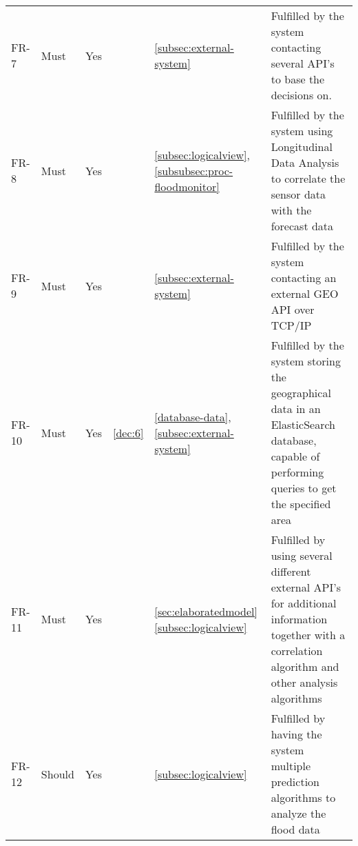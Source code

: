 \begin{table}[H]
\begin{tabular}{lllllL{0.5\textwidth}}
		FR-7  & Must     & Yes        & &\ref{subsec:external-system}         & Fulfilled by the system contacting several API's to base the decisions on. \\ 
		
		FR-8  & Must     & Yes        & &\ref{subsec:logicalview}, \ref{subsubsec:proc-floodmonitor} & Fulfilled by the system using Longitudinal Data Analysis to correlate the sensor data with the forecast data \\ 
		
		FR-9  & Must     & Yes        & &\ref{subsec:external-system} & Fulfilled by the system contacting an external GEO API over TCP/IP\\
		
		FR-10 & Must     & Yes        & \ref{dec:6} & \ref{database-data},\ref{subsec:external-system} & Fulfilled by the system storing the geographical data in an ElasticSearch database, capable of performing queries to get the specified area \\ 
		
		FR-11 & Must     & Yes & &\ref{sec:elaboratedmodel} \ref{subsec:logicalview}  & Fulfilled by using several different external API's for additional information together with a correlation algorithm and other analysis algorithms \\ 
		
		FR-12 & Should & Yes & & \ref{subsec:logicalview} & Fulfilled by having the system multiple prediction algorithms to analyze the flood data\\ 


\end{tabular}
\end{table}
